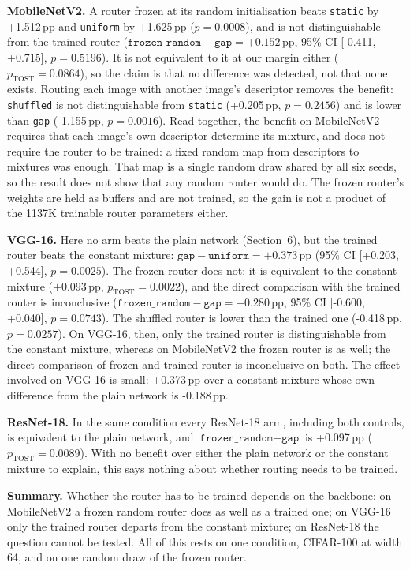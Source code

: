 \documentclass{article}
\begin{document}
\textbf{MobileNetV2.}  A router frozen at its random initialisation
beats \texttt{static} by +1.512\,pp and \texttt{uniform}
by +1.625\,pp ($p=0.0008$), and is
not distinguishable from the trained router
($\texttt{frozen\_random}-\texttt{gap}=+0.152$\,pp,
95\% CI [-0.411, +0.715],
$p=0.5196$). It is not equivalent to it at our margin
either ($p_{\text{TOST}}=0.0864$), so the claim is that no
difference was detected, not that none exists. Routing each image with
another image's descriptor removes the benefit: \texttt{shuffled} is not
distinguishable from \texttt{static} (+0.205\,pp,
$p=0.2456$) and is lower than \texttt{gap}
(-1.155\,pp, $p=0.0016$). Read together, the
benefit on MobileNetV2 requires that each image's own descriptor determine
its mixture, and does not require the router to be trained: a fixed random
map from descriptors to mixtures was enough. That map is a single random
draw shared by all six seeds, so the result does not show that any random
router would do. The frozen router's weights are
held as buffers and are not trained, so the gain is not a product of the
1137K trainable router parameters either.

\textbf{VGG-16.}  Here no arm beats the plain network
(Section~6), but the trained router beats the constant
mixture: $\texttt{gap}-\texttt{uniform}=+0.373$\,pp
(95\% CI [+0.203, +0.544],
$p=0.0025$). The frozen router does not: it is equivalent to
the constant mixture ($+0.093$\,pp,
$p_{\text{TOST}}=0.0022$), and the direct comparison
with the trained router is inconclusive
($\texttt{frozen\_random}-\texttt{gap}=-0.280$\,pp,
95\% CI [-0.600,
+0.040], $p=0.0743$). The shuffled
router is lower than the trained one (-0.418\,pp,
$p=0.0257$). On VGG-16, then, only the trained router is
distinguishable from the constant mixture, whereas on MobileNetV2 the
frozen router is as well; the direct comparison of frozen and trained
router is inconclusive on both. The effect involved on VGG-16 is small: +0.373\,pp over a constant
mixture whose own difference from the plain network is -0.188\,pp.

\textbf{ResNet-18.}  In the same condition every ResNet-18 arm,
including both controls, is equivalent to the plain network, and
$\texttt{frozen\_random}-\texttt{gap}$ is +0.097\,pp
($p_{\text{TOST}}=0.0089$). With no benefit over either the plain
network or the constant mixture to explain, this says nothing about
whether routing needs to be trained.

\textbf{Summary.}  Whether the router has to be trained depends on the
backbone: on MobileNetV2 a frozen random router does as well as a trained
one; on VGG-16 only the trained router departs from the constant mixture;
on ResNet-18 the question cannot be tested. All of this rests on one condition, CIFAR-100 at width 64, and
on one random draw of the frozen router.
\end{document}
